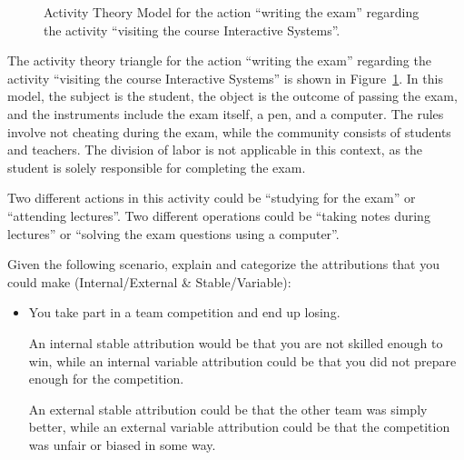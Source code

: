 \begin{ejercicio}
\begin{figure}
        \caption{Activity Theory Model for the action ``writing the exam'' regarding the activity ``visiting the course Interactive Systems''.}
        \label{fig:activity-theory2}
    \end{figure}

    The activity theory triangle for the action ``writing the exam'' regarding the activity ``visiting the course Interactive Systems'' is shown in Figure~\ref{fig:activity-theory2}. In this model, the subject is the student, the object is the outcome of passing the exam, and the instruments include the exam itself, a pen, and a computer. The rules involve not cheating during the exam, while the community consists of students and teachers. The division of labor is not applicable in this context, as the student is solely responsible for completing the exam.

    Two different actions in this activity could be ``studying for the exam'' or ``attending lectures''. Two different operations could be ``taking notes during lectures'' or ``solving the exam questions using a computer''.
\end{ejercicio}

\begin{ejercicio}
    Given the following scenario, explain and categorize the attributions that you could make (Internal/External \& Stable/Variable):
    \begin{itemize}
        \item You take part in a team competition and end up losing.
        
        An internal stable attribution would be that you are not skilled enough to win, while an internal variable attribution could be that you did not prepare enough for the competition.
        
        An external stable attribution could be that the other team was simply better, while an external variable attribution could be that the competition was unfair or biased in some way.
    \end{itemize}
\end{ejercicio}

